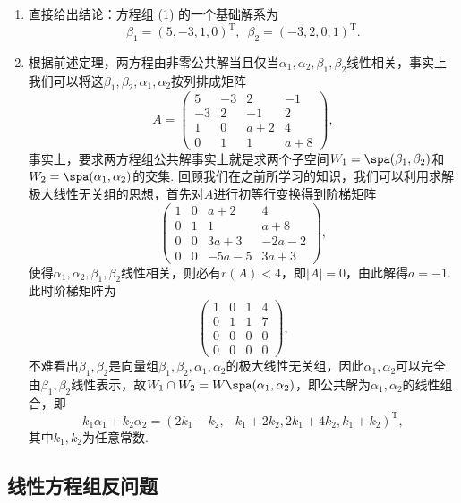 \begin{solution}
    \begin{enumerate}
        \item 直接给出结论：方程组 (1) 的一个基础解系为
              \[\beta_1=(5,-3,1,0)^{\mathrm{T}},\enspace\beta_2=(-3,2,0,1)^{\mathrm{T}}.\]

        \item 根据前述定理，两方程由非零公共解当且仅当$\alpha_1,\alpha_2,\beta_1,\beta_2$线性相关，事实上我们可以将这$\beta_1,\beta_2,\alpha_1,\alpha_2$按列排成矩阵
              \[A=\begin{pmatrix}
                      5 & -3 & 2 & -1 \\ -3 & 2 & -1 & 2 \\ 1 & 0 & a+2 & 4 \\ 0 & 1 & 1 & a+8
                  \end{pmatrix},\]
              事实上，要求两方程组公共解事实上就是求两个子空间$W_1=\spa(\beta_1,\beta_2)$和$W_2=\spa(\alpha_1,\alpha_2)$的交集. 回顾我们在之前所学习的知识，我们可以利用求解极大线性无关组的思想，首先对$A$进行初等行变换得到阶梯矩阵
              \[\begin{pmatrix}
                      1 & 0 & a+2 & 4 \\ 0 & 1 & 1 & a+8 \\ 0 & 0 & 3a+3 & -2a-2 \\ 0 & 0 & -5a-5 & 3a+3
                  \end{pmatrix},\]
              使得$\alpha_1,\alpha_2,\beta_1,\beta_2$线性相关，则必有$r(A)<4$，即$|A|=0$，由此解得$a=-1$. 此时阶梯矩阵为
              \[\begin{pmatrix}
                      1 & 0 & 1 & 4 \\ 0 & 1 & 1 & 7 \\ 0 & 0 & 0 & 0 \\ 0 & 0 & 0 & 0
                  \end{pmatrix},\]
              不难看出$\beta_1,\beta_2$是向量组$\beta_1,\beta_2,\alpha_1,\alpha_2$的极大线性无关组，因此$\alpha_1,\alpha_2$可以完全由$\beta_1,\beta_2$线性表示，故$W_1\cap W_2=W\spa(\alpha_1,\alpha_2)$，即公共解为$\alpha_1,\alpha_2$的线性组合，即
              \[k_1\alpha_1+k_2\alpha_2=(2k_1-k_2,-k_1+2k_2,2k_1+4k_2,k_1+k_2)^\mathrm{T},\]
              其中$k_1,k_2$为任意常数.
    \end{enumerate}
\end{solution}

\subsection{线性方程组反问题}

